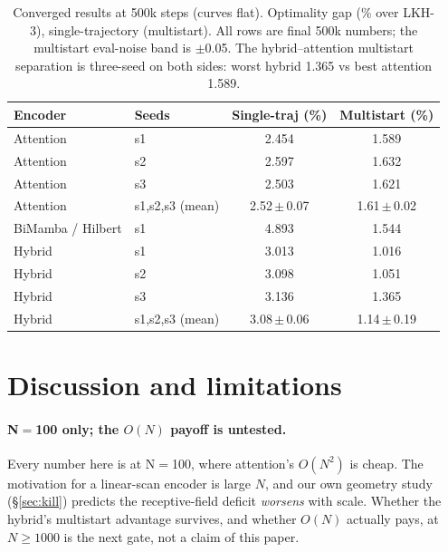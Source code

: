 \documentclass[11pt]{article}
\newcommand{\headrow}{\rowcolor{headtint}}
\newcommand{\pct}{\%}
\begin{document}
\begin{table}[t]
\centering
\caption{Converged results at 500k steps (curves flat). Optimality gap (\pct{}
over LKH-3), single-trajectory (multistart). All rows are final 500k numbers;
the multistart eval-noise band is $\pm$0.05. The hybrid--attention multistart
separation is three-seed on both sides: worst hybrid 1.365 vs best attention
1.589.}
\label{tab:conv}
\setlength{\tabcolsep}{5pt}
\begin{tabular}{ll cc}
\toprule
\headrow
Encoder & Seeds & Single-traj (\pct{}) & Multistart (\pct{}) \\
\midrule
Attention & s1              & 2.454 & 1.589 \\
Attention & s2              & 2.597 & 1.632 \\
Attention & s3              & 2.503 & 1.621 \\
Attention & s1,s2,s3 (mean) & 2.52\,$\pm$\,0.07 & 1.61\,$\pm$\,0.02 \\
\midrule
BiMamba / Hilbert & s1      & 4.893 & 1.544 \\
\midrule
Hybrid & s1                 & 3.013 & 1.016 \\
Hybrid & s2                 & 3.098 & 1.051 \\
Hybrid & s3                 & 3.136 & 1.365 \\
Hybrid & s1,s2,s3 (mean)    & 3.08\,$\pm$\,0.06 & 1.14\,$\pm$\,0.19 \\
\bottomrule
\end{tabular}
\end{table}

\section{Discussion and limitations}
\label{sec:discussion}

\paragraph{N$=$100 only; the $O(N)$ payoff is untested.}
Every number here is at N$=$100, where attention's $O(N^2)$ is cheap. The
motivation for a linear-scan encoder is large $N$, and our own geometry study
(\S\ref{sec:kill}) predicts the receptive-field deficit \emph{worsens} with scale.
Whether the hybrid's multistart advantage survives, and whether $O(N)$ actually
pays, at $N\geq1000$ is the next gate, not a claim of this paper.
\end{document}
